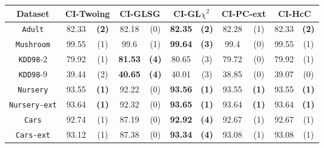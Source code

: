     \begin{table}
    \small
      \centering

\begin{tabular}{c|cc|cc|cc|cc|cc} 
Dataset             & \multicolumn{2}{c|}{CI-Twoing} &   \multicolumn{2}{c|}{CI-GLSG} & \multicolumn{2}{c|}{CI-GL$\chi^2$} & \multicolumn{2}{c|}{CI-PC-ext}& \multicolumn{2}{c}{CI-HcC}\\
\hline   
{\tt Adult}         & 82.33      &  {\bf (2)}        &   82.18      & (0)             & {\bf 82.35} &  {\bf (2)}           & 82.28       & (1)             & 82.33       & {\bf (2)}   \\
{\tt Mushroom}      & 99.55      &  (1)              &   99.6       & (1)             & {\bf 99.64} &  {\bf (3)}           & 99.4        & (0)             & 99.55       & (1)         \\
{\tt KDD98}-2       & 79.92      &  (1)              &  {\bf 81.53} & {\bf (4)}       &  80.65      &  (3)                 & 79.72       & (0)             & 79.92       & (1)         \\
{\tt KDD98}-9       & 39.44      &  (2)              &  {\bf 40.65} & {\bf (4)}       &  40.01      &  (3)                 & 38.85       & (0)             & 39.07       & (0)         \\
{\tt Nursery}       & 93.55      &  {\bf (1)}        &   92.22      & (0)             & {\bf 93.56} &  {\bf (1)}           & 93.55       & {\bf (1)}       & 93.55       & {\bf (1)}   \\
{\tt Nursery-ext}   & 93.64      &  {\bf (1)}        &   92.32      & (0)             & {\bf 93.65} &  {\bf (1)}           & 93.64       & {\bf (1)}       & 93.64       & {\bf (1)}   \\
{\tt Cars}          & 92.74      &  (1)              &   87.19      & (0)             & {\bf 92.92} &  {\bf (4)}           & 92.67       & (1)             & 92.67       & (1)         \\
{\tt Cars-ext}      & 93.12      &  (1)              &   87.38      & (0)             & {\bf 93.34} &  {\bf (4)}           & 93.08       & (1)             & 93.08       & (1)         \\

\end{tabular}
\end{table}
